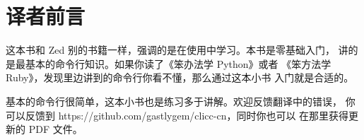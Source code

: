 \chapter*{译者前言}

这本书和 Zed 别的书籍一样，强调的是在使用中学习。本书是零基础入门，
讲的是最基本的命令行知识。如果你读了《笨办法学 Python》或者
《笨方法学 Ruby》，发现里边讲到的命令行你看不懂，那么通过这本小书
入门就是合适的。

基本的命令行很简单，这本小书也是练习多于讲解。欢迎反馈翻译中的错误，
你可以反馈到 https://github.com/gastlygem/clicc-cn，同时你也可以
在那里获得更新的 PDF 文件。
